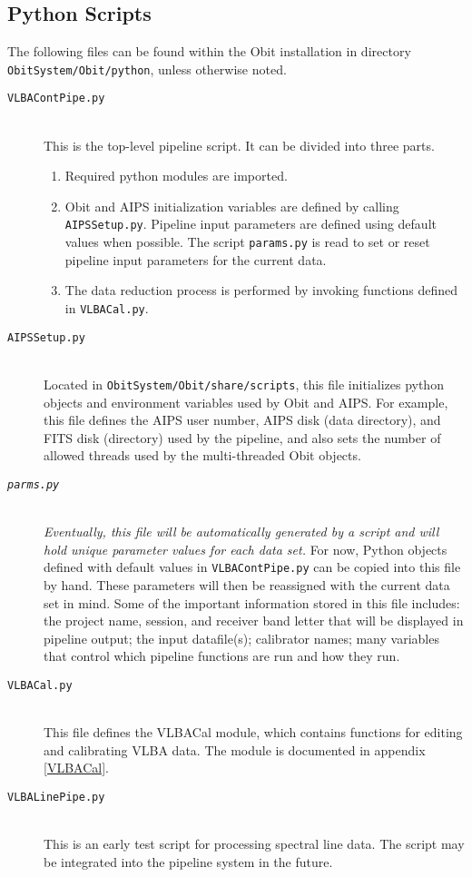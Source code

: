 \documentclass[10pt,onecolumn,final]{IEEEtran}
\begin{document}
\subsection{Python Scripts}

The following files can be found within the Obit installation in directory {\tt ObitSystem/Obit/python}, unless otherwise noted.

\begin{description}
\item[\tt VLBAContPipe.py] \hfill \\ This is the top-level pipeline script. It can be divided into three parts.
	\begin{enumerate}
		\item Required python modules are imported.  
		\item Obit and AIPS initialization variables are defined by calling {\tt AIPSSetup.py}.  Pipeline input parameters are defined using default values when possible.  The script {\tt params.py} is read to set or reset pipeline input parameters for the current data.  
		\item The data reduction process is performed by invoking functions defined in {\tt VLBACal.py}.
	\end{enumerate}

\item[\tt AIPSSetup.py] \hfill \\ Located in \verb|ObitSystem/Obit/share/scripts|, this file initializes python objects and environment variables used by Obit and AIPS.  For example, this file defines the AIPS user number, AIPS disk (data directory), and FITS disk (directory) used by the pipeline, and also sets the number of allowed threads used by the multi-threaded Obit objects.

\item[\tt \emph{parms.py}] \hfill \\ \emph{Eventually, this file will be automatically generated by a script and will hold unique parameter values for each data set.}  For now, Python objects defined with default values in {\tt VLBAContPipe.py} can be copied into this file by hand.  These parameters will then be reassigned with the current data set in mind.  Some of the important information stored in this file includes: the project name, session, and receiver band letter that will be displayed in pipeline output; the input datafile(s); calibrator names; many variables that control which pipeline functions are run and how they run.

\item[\tt VLBACal.py] \hfill \\ This file defines the VLBACal module, which contains functions for editing and calibrating VLBA data.  The module is documented in appendix \ref{VLBACal}.

\item[\tt VLBALinePipe.py] \hfill \\  This is an early test script for processing spectral line data.  The script may be integrated into the pipeline system in the future.
\end{description}
\end{document}
